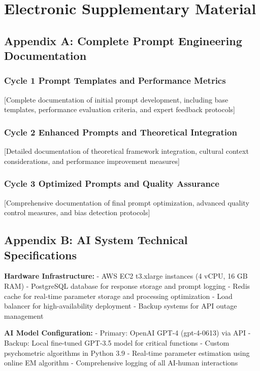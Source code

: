 \documentclass[12pt,a4paper]{article}
\begin{document}
\newpage




\newpage

\section{Electronic Supplementary Material}

\subsection{Appendix A: Complete Prompt Engineering Documentation}

\subsubsection{Cycle 1 Prompt Templates and Performance Metrics}
[Complete documentation of initial prompt development, including base templates, performance evaluation criteria, and expert feedback protocols]

\subsubsection{Cycle 2 Enhanced Prompts and Theoretical Integration}
[Detailed documentation of theoretical framework integration, cultural context considerations, and performance improvement measures]

\subsubsection{Cycle 3 Optimized Prompts and Quality Assurance}
[Comprehensive documentation of final prompt optimization, advanced quality control measures, and bias detection protocols]

\subsection{Appendix B: AI System Technical Specifications}

\textbf{Hardware Infrastructure:}
- AWS EC2 t3.xlarge instances (4 vCPU, 16 GB RAM)
- PostgreSQL database for response storage and prompt logging
- Redis cache for real-time parameter storage and processing optimization
- Load balancer for high-availability deployment
- Backup systems for API outage management

\textbf{AI Model Configuration:}
- Primary: OpenAI GPT-4 (gpt-4-0613) via API
- Backup: Local fine-tuned GPT-3.5 model for critical functions
- Custom psychometric algorithms in Python 3.9
- Real-time parameter estimation using online EM algorithm
- Comprehensive logging of all AI-human interactions
\end{document}
